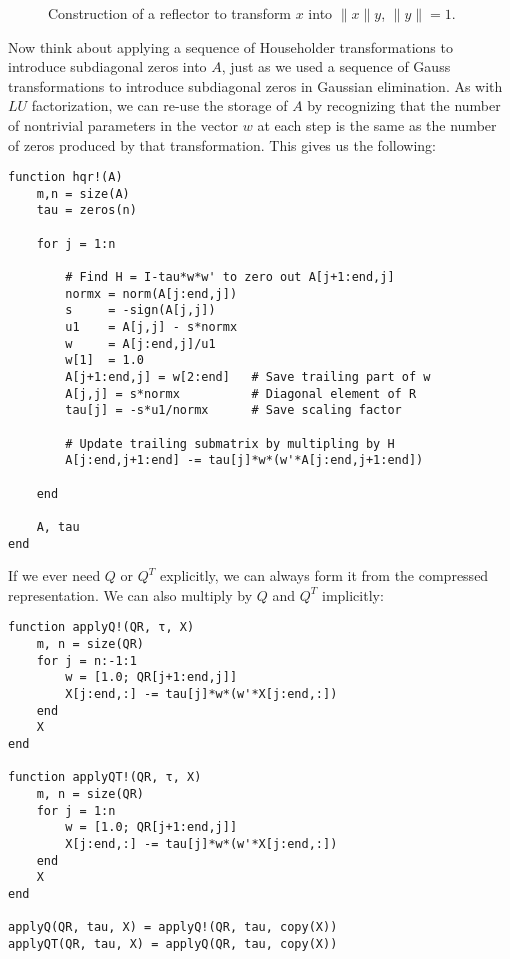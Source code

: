 \documentclass[12pt, leqno]{article} %
\begin{document}
\begin{figure}
\begin{center}
\end{center}
\caption{Construction of a reflector to transform $x$ into $\|x\|y$,
         $\|y\| = 1$.}
\label{fig1}
\end{figure}

Now think about applying a sequence of Householder transformations to
introduce subdiagonal zeros into $A$, just as we used a sequence of Gauss
transformations to introduce subdiagonal zeros in Gaussian elimination.
As with $LU$ factorization, we can re-use the storage of $A$ by recognizing
that the number of nontrivial parameters in the vector $w$ at each step
is the same as the number of zeros produced by that transformation.
This gives us the following:
\begin{lstlisting}
function hqr!(A)
    m,n = size(A)
    tau = zeros(n)

    for j = 1:n

        # Find H = I-tau*w*w' to zero out A[j+1:end,j]
        normx = norm(A[j:end,j])
        s     = -sign(A[j,j])
        u1    = A[j,j] - s*normx
        w     = A[j:end,j]/u1
        w[1]  = 1.0
        A[j+1:end,j] = w[2:end]   # Save trailing part of w
        A[j,j] = s*normx          # Diagonal element of R
        tau[j] = -s*u1/normx      # Save scaling factor

        # Update trailing submatrix by multipling by H
        A[j:end,j+1:end] -= tau[j]*w*(w'*A[j:end,j+1:end])

    end

    A, tau
end
\end{lstlisting}

If we ever need $Q$ or $Q^T$ explicitly, we can always form it from
the compressed representation.  We can also multiply by $Q$ and $Q^T$
implicitly:
\begin{lstlisting}
function applyQ!(QR, τ, X)
    m, n = size(QR)
    for j = n:-1:1
        w = [1.0; QR[j+1:end,j]]
        X[j:end,:] -= tau[j]*w*(w'*X[j:end,:])
    end
    X
end

function applyQT!(QR, τ, X)
    m, n = size(QR)
    for j = 1:n
        w = [1.0; QR[j+1:end,j]]
        X[j:end,:] -= tau[j]*w*(w'*X[j:end,:])
    end
    X
end

applyQ(QR, tau, X) = applyQ!(QR, tau, copy(X))
applyQT(QR, tau, X) = applyQ(QR, tau, copy(X))
\end{lstlisting}
\end{document}
